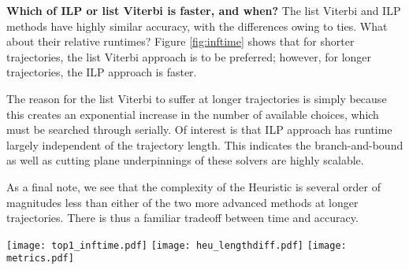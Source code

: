 \textbf{Which of ILP or list Viterbi is faster, and when?}
The list Viterbi and ILP methods have highly similar accuracy, with the differences owing to ties.
What about their relative runtimes?
Figure \ref{fig:inftime} shows that for shorter trajectories, the list Viterbi approach is to be preferred;
however, for longer trajectories, the ILP approach is faster.

The reason for the list Viterbi to suffer at longer trajectories is simply because this creates an exponential increase in the number of available choices, which must be searched through serially.
Of interest is that ILP approach has runtime largely independent of the trajectory length.
This indicates the branch-and-bound as well as cutting plane underpinnings of these solvers are highly scalable.

As a final note, we see that the complexity of the Heuristic is several order of magnitudes less than either of the two more advanced methods at longer trajectories.
There is thus a familiar tradeoff between time and accuracy.



\begin{figure*}[!t]
\begin{minipage}[c]{0.8\textwidth}
		\centering
		\texttt{[image: top1\_inftime.pdf]}
	    \label{fig:inftime}
		\quad
		\centering
		\texttt{[image: heu\_lengthdiff.pdf]}
	    \label{fig:length-christo}
		\quad
		\centering
		\texttt{[image: metrics.pdf]}
	    \label{fig:acc-vs-length}
\end{minipage}
\end{figure*}
